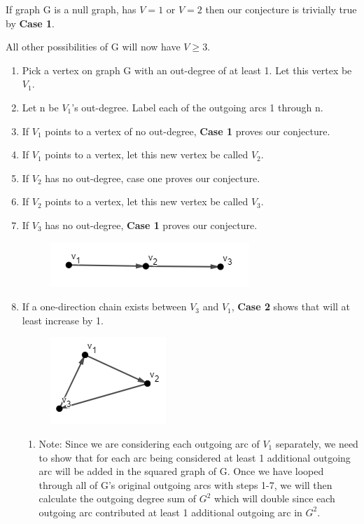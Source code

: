 \documentclass{article}
\begin{document}
\begin{flushleft}

If graph G is a null graph, has $V=1$ or $V=2$ then our conjecture is trivially true by \textbf{Case 1}.

All other possibilities of G will now have $V\geq3$.
\begin{enumerate}
\item Pick a vertex on graph G with an out-degree of at least 1. Let this vertex be $V_1$.
\item Let n be $V_1$’s out-degree. Label each of the outgoing arcs 1 through n.
\item If $V_1$ points to a vertex of no out-degree, \textbf{Case 1} proves our conjecture.
\item If $V_1$ points to a vertex, let this new vertex be called $V_2$.
\item If $V_2$ has no out-degree, case one proves our conjecture.
\item If $V_2$ points to a vertex, let this new vertex be called $V_3$.
\newpage
\item If $V_3$ has no out-degree, \textbf{Case 1} proves our conjecture.
\begin{figure}[ht]
\centering
\includegraphics{p3.PNG}
\end{figure}
\item If a one-direction chain exists between $V_3$ and $V_1$, \textbf{Case 2} shows that will at least increase by 1. 
\begin{figure}[ht]
\centering
\includegraphics{31.PNG}
\end{figure}
\begin{enumerate}
\item Note: Since we are considering each outgoing arc of $V_1$ separately, we need to show that for each arc being considered at least 1 additional outgoing arc will be added in the squared graph of G. Once we have looped through all of G’s original outgoing arcs with steps 1-7, we will then calculate the outgoing degree sum of $G^2$ which will double since each outgoing arc contributed at least 1 additional outgoing arc in $G^2$.

\end{enumerate}
\end{enumerate}
\end{flushleft}
\end{document}
